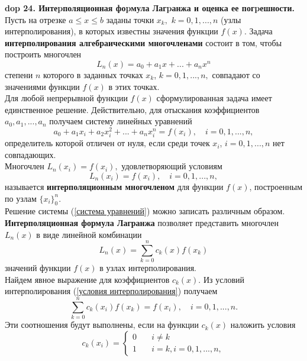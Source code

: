 \setcounter{section}{4}
\setcounter{subsection}{24}
\setcounter{equation}{0}
\textbf{\LARGE dop 24. Интеpполяционная фоpмула Лагpанжа и оценка ее погpешности.}  \\

Пусть на отрезке $a \leq x \leq b$ заданы точки $x_k,$ $k=0,1,...,n$ (узлы интерполирования), в которых известны значения функции $f(x)$. Задача \textbf{интерполирования алгебраическими многочленами} состоит в том, чтобы построить многочлен
\begin{equation*}
    L_n(x)=a_0+a_1x+...+a_nx^n
\end{equation*}
степени $n$ которого в заданных точках $x_k$, $k=0,1,...,n,$ совпадают со значениями функции $f(x)$ в этих точках. \\
Для любой непрерывной функции $f(x)$ сформулированная задача имеет единственное решение. Действительно, для отыскания коэффициентов $a_0, a_1, ...,a_n$ получаем систему линейных уравнений
\begin{equation}
    \label{система уравнений}
    a_0 + a_1x_i+a_2x_i^2+...+a_nx_i^n=f(x_i), \quad i =0,1,...,n,
\end{equation}
определитель которой отличен от нуля, если среди точек $x_i$, $i=0,1,...,n$ нет совпадающих. \\
Многочлен $L_n(x_i)=f(x_i),$ удовлетворяющий условиям
\begin{equation}
    \label{условия интерполирования}
    L_n(x_i)=f(x_i), \quad i =0,1,...,n,
\end{equation}
называется \textbf{интерполяционным многочленом} для функции $f(x)$, построенным по узлам $\{x_i\}_0^n$. \\
Решение системы (\ref{система уравнений}) можно записать различным образом. \textbf{Интерполяционная формула Лагранжа} позволяет представить многочлен $L_n(x)$  в виде линейной комбинации
\begin{equation}
    \label{интерполяционная формула лагранжа}
    L_n(x) = \sum_{k=0}^{n} c_k(x) f(x_k)
\end{equation}
значений функции $f(x)$ в узлах интерполирования. \\
Найдем явное выражение для коэффициентов $c_k(x)$. Из условий интерполирования (\ref{условия интерполирования}) получаем
\begin{equation*}
    \sum_{k=0}^{n} c_k(x_i) f(x_k) = f(x_i), \quad i=0,1,...,n.
\end{equation*}
Эти соотношения будут выполнены, если на функции $c_k(x)$ наложить условия
\begin{equation*}
    c_k(x_i) =
    \begin{cases}
    0       & \quad i \neq k\\
    1  & \quad i = k, i =0,1,...,n,
  \end{cases}
\end{equation*}
